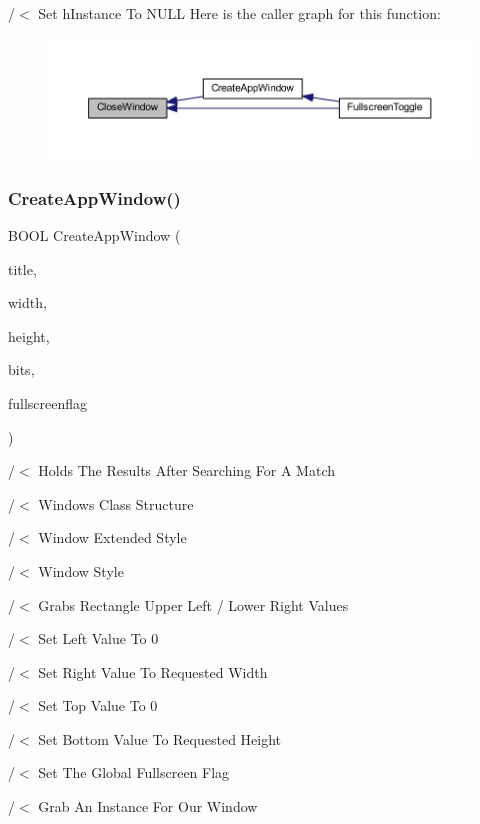 /$<$ Set h\+Instance To N\+U\+LL Here is the caller graph for this function\+:\nopagebreak
\begin{figure}[H]
\begin{center}
\leavevmode
\includegraphics[width=350pt]{supportcode_8cpp_a4709a40ac779c9bbb341a15554eae549_icgraph}
\end{center}
\end{figure}
\mbox{\label{supportcode_8cpp_acd4be192aca2369a87f51d952150a77b}} 
\subsubsection{Create\+App\+Window()}
{\footnotesize\ttfamily B\+O\+OL Create\+App\+Window (\begin{DoxyParamCaption}\item[{const char $\ast$}]{title,  }\item[{int}]{width,  }\item[{int}]{height,  }\item[{int}]{bits,  }\item[{bool}]{fullscreenflag }\end{DoxyParamCaption})}

/$<$ Holds The Results After Searching For A Match

/$<$ Windows Class Structure

/$<$ Window Extended Style

/$<$ Window Style

/$<$ Grabs Rectangle Upper Left / Lower Right Values

/$<$ Set Left Value To 0

/$<$ Set Right Value To Requested Width

/$<$ Set Top Value To 0

/$<$ Set Bottom Value To Requested Height

/$<$ Set The Global Fullscreen Flag

/$<$ Grab An Instance For Our Window

